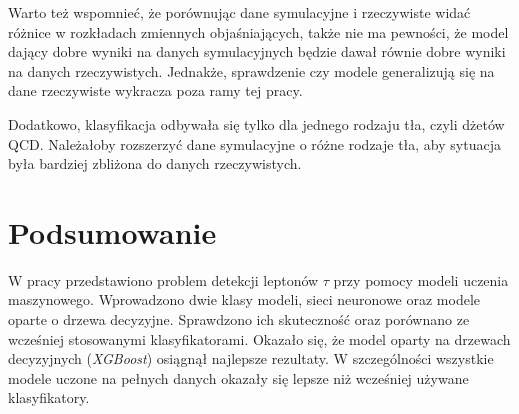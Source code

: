 \documentclass{pracalicmgr}
\begin{document}
	Warto też wspomnieć, że porównując dane symulacyjne i rzeczywiste widać różnice w rozkładach zmiennych objaśniających, także nie ma pewności, że model dający dobre wyniki na danych symulacyjnych będzie dawał równie dobre wyniki na danych rzeczywistych. Jednakże, sprawdzenie czy modele generalizują się na dane rzeczywiste wykracza poza ramy tej pracy.
	
	Dodatkowo, klasyfikacja odbywała się tylko dla jednego rodzaju tła, czyli dżetów QCD. Należałoby rozszerzyć dane symulacyjne o różne rodzaje tła, aby sytuacja była bardziej zbliżona do danych rzeczywistych.
	
    \chapter{Podsumowanie}
    
	W pracy przedstawiono problem detekcji leptonów $\tau$ przy pomocy modeli uczenia maszynowego. Wprowadzono dwie klasy modeli, sieci neuronowe oraz modele oparte o drzewa decyzyjne. Sprawdzono ich skuteczność oraz porównano ze wcześniej stosowanymi klasyfikatorami. Okazało się, że model oparty na drzewach decyzyjnych (\textit{XGBoost}) osiągnął najlepsze rezultaty. W szczególności wszystkie modele uczone na pełnych danych okazały się lepsze niż wcześniej używane klasyfikatory.
    
    \printbibliography
    
\end{document}
